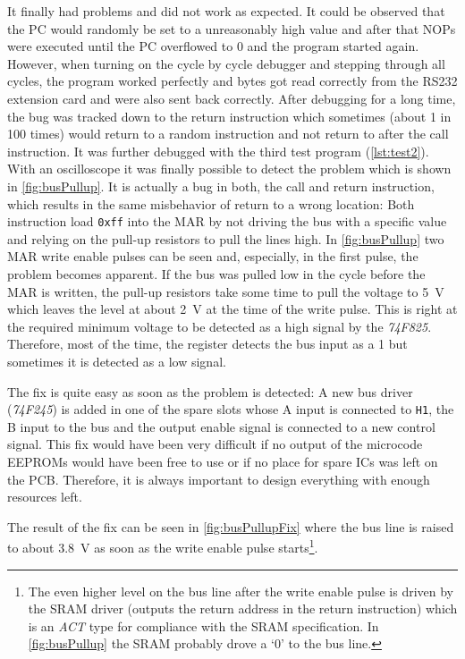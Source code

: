 It finally had problems and did not work as expected.
It could be observed that the \gls{PC} would randomly be set to a unreasonably high value and after that \glspl{NOP} were executed until the \gls{PC} overflowed to 0 and the program started again.
However, when turning on the cycle by cycle debugger and stepping through all cycles, the program worked perfectly and bytes got read correctly from the RS232 extension card and were also sent back correctly.
After debugging for a long time, the bug was tracked down to the return instruction which sometimes (about 1 in 100 times) would return to a random instruction and not return to after the call instruction.
It was further debugged with the third test program (\cref{lst:test2}).
With an oscilloscope it was finally possible to detect the problem which is shown in \cref{fig:busPullup}.
It is actually a bug in both, the call and return instruction, which results in the same misbehavior of return to a wrong location:
Both instruction load \texttt{0xff} into the \gls{MAR} by not driving the bus with a specific value and relying on the pull-up resistors to pull the lines high.
In \cref{fig:busPullup} two \gls{MAR} write enable pulses can be seen and, especially, in the first pulse, the problem becomes apparent.
If the bus was pulled low in the cycle before the \gls{MAR} is written, the pull-up resistors take some time to pull the voltage to \qty{5}{\volt} which leaves the level at about \qty{2}{\volt} at the time of the write pulse.
This is right at the required minimum voltage to be detected as a high signal by the \emph{74F825}.
Therefore, most of the time, the register detects the bus input as a 1 but sometimes it is detected as a low signal.

The fix is quite easy as soon as the problem is detected:
A new bus driver (\emph{74F245}) is added in one of the spare slots whose A input is connected to \texttt{H1}, the B input to the bus and the output enable signal is connected to a new control signal.
This fix would have been very difficult if no output of the microcode \glspl{EEPROM} would have been free to use or if no place for spare \glspl{IC} was left on the \gls{PCB}.
Therefore, it is always important to design everything with enough resources left.

The result of the fix can be seen in \cref{fig:busPullupFix} where the bus line is raised to about \qty{3.8}{\volt} as soon as the write enable pulse starts\footnote{The even higher level on the bus line after the write enable pulse is driven by the \gls{SRAM} driver (outputs the return address in the return instruction) which is an \emph{ACT} type for compliance with the \gls{SRAM} specification. In \cref{fig:busPullup} the \gls{SRAM} probably drove a `0' to the bus line.}.

